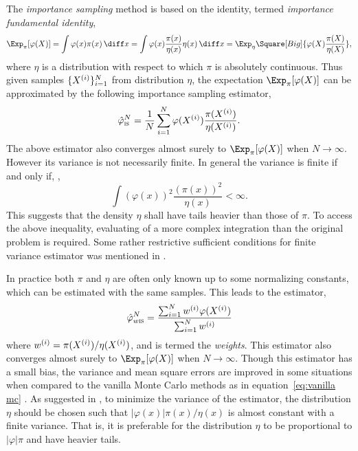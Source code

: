 \documentclass[11pt, hyper, bib, fontset=Minion]{marticle}
\begin{document}
The \emph{importance sampling} method is based on the identity, termed
\emph{importance fundamental identity},
\begin{equation}
  \Exp_{\pi}[\varphi(X)]
  = \int\varphi(x)\pi(x)\intd x
  = \int\varphi(x)\frac{\pi(x)}{\eta(x)}\eta(x)\intd x
  = \Exp_{\eta}\Square[Big]{\varphi(X)\frac{\pi(X)}{\eta(X)}},
\end{equation}
where $\eta$ is a distribution with respect to which $\pi$ is absolutely
continuous. Thus given \iid samples $\{X^{(i)}\}_{i=1}^N$ from distribution
$\eta$, the expectation $\Exp_{\pi}[\varphi(X)]$ can be approximated by the
following importance sampling estimator,
\begin{equation}
  \hat\varphi_{\text{\textsc{is}}}^N
  = \frac{1}{N}\sum_{i=1}^N\varphi(X^{(i)})\frac{\pi(X^{(i)})}{\eta(X^{(i)})}.
\end{equation}
The above estimator also converges almost surely to $\Exp_{\pi}[\varphi(X)]$
when $N\to\infty$. However its variance is not necessarily finite. In general
the variance is finite if and only if,
\parencite[see][sec.~3.3]{Robert:2004tn},
\begin{equation}
  \int(\varphi(x))^2\frac{(\pi(x))^2}{\eta(x)} < \infty.
\end{equation}
This suggests that the density $\eta$ shall have tails heavier than those of
$\pi$. To access the above inequality, evaluating of a more complex
integration than the original problem is required. Some rather restrictive
sufficient conditions for finite variance estimator was mentioned in
\textcite{Geweke:1989tm}.

In practice both $\pi$ and $\eta$ are often only known up to some normalizing
constants, which can be estimated with the same samples. This leads to the
estimator,
\begin{equation}
  \hat\varphi_{w\text{\textsc{is}}}^N
  = \frac{\sum_{i=1}^Nw^{(i)}\varphi(X^{(i)})}{\sum_{i=1}^Nw^{(i)}}
\end{equation}
where $w^{(i)} = \pi(X^{(i)})/\eta(X^{(i)})$, and is termed the \emph{weights}.  This
estimator also converges almost surely to $\Exp_{\pi}[\varphi(X)]$ when
$N\to\infty$. Though this estimator has a small bias, the variance and mean
square errors are improved in some situations when compared to the vanilla
Monte Carlo methods as in equation~\eqref{eq:vanilla mc}
\parencite{Casella:1998tj}. As suggested in
\textcite[][sec.~3.3]{Robert:2004tn}, to minimize the variance of the
estimator, the distribution $\eta$ should be chosen such that
$|\varphi(x)|\pi(x)/\eta(x)$ is almost constant with a finite variance. That
is, it is preferable for the distribution $\eta$ to be proportional to
$|\varphi|\pi$ and have heavier tails.
\end{document}
